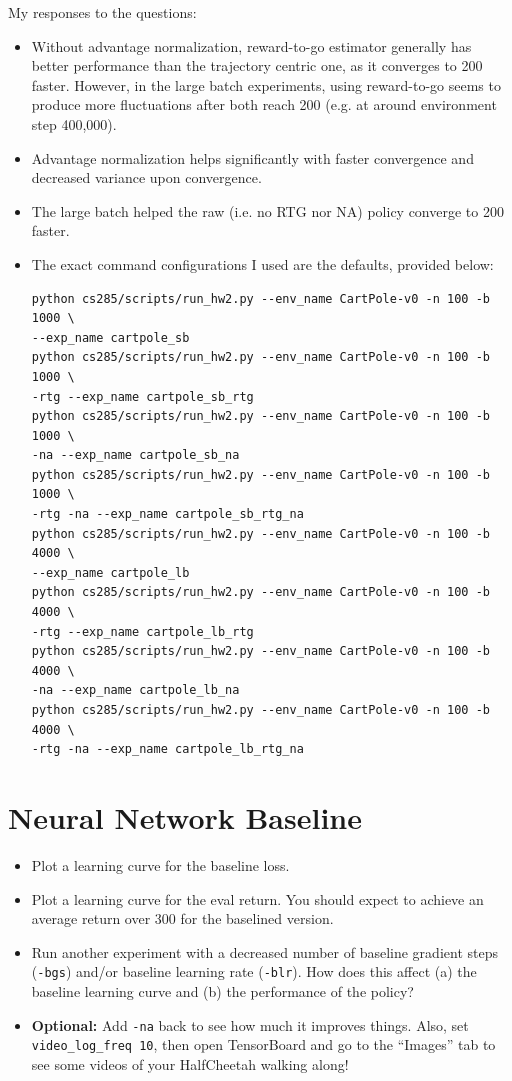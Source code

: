 \documentclass{article}
\begin{document}
\begin{sol}
    My responses to the questions:
    \begin{itemize}
        \item Without advantage normalization, reward-to-go estimator generally has better performance than the trajectory centric one, as it converges to 200 faster. However, in the large batch experiments, using reward-to-go seems to produce more fluctuations after both reach 200 (e.g. at around environment step 400,000).
        \item Advantage normalization helps significantly with faster convergence and decreased variance upon convergence.
        \item The large batch helped the raw (i.e. no RTG nor NA) policy converge to 200 faster.
        \item The exact command configurations I used are the defaults, provided below:
        \begin{lstlisting}
python cs285/scripts/run_hw2.py --env_name CartPole-v0 -n 100 -b 1000 \
--exp_name cartpole_sb
python cs285/scripts/run_hw2.py --env_name CartPole-v0 -n 100 -b 1000 \
-rtg --exp_name cartpole_sb_rtg
python cs285/scripts/run_hw2.py --env_name CartPole-v0 -n 100 -b 1000 \
-na --exp_name cartpole_sb_na
python cs285/scripts/run_hw2.py --env_name CartPole-v0 -n 100 -b 1000 \
-rtg -na --exp_name cartpole_sb_rtg_na
python cs285/scripts/run_hw2.py --env_name CartPole-v0 -n 100 -b 4000 \
--exp_name cartpole_lb
python cs285/scripts/run_hw2.py --env_name CartPole-v0 -n 100 -b 4000 \
-rtg --exp_name cartpole_lb_rtg
python cs285/scripts/run_hw2.py --env_name CartPole-v0 -n 100 -b 4000 \
-na --exp_name cartpole_lb_na
python cs285/scripts/run_hw2.py --env_name CartPole-v0 -n 100 -b 4000 \
-rtg -na --exp_name cartpole_lb_rtg_na
        \end{lstlisting}
    \end{itemize}
\end{sol}

\newpage\section{Neural Network Baseline}
\begin{itemize}
    \item Plot a learning curve for the baseline loss.
    \item Plot a learning curve for the eval return. You should expect to achieve an average return over 300 for the baselined version.
    \item Run another experiment with a decreased number of baseline gradient steps (\verb|-bgs|) and/or baseline learning rate (\verb|-blr|). How does this affect (a) the baseline learning curve and (b) the performance of the policy?
    \item \textbf{Optional:} Add \verb|-na| back to see how much it improves things. Also, set \verb|video_log_freq 10|, then open TensorBoard and go to the ``Images'' tab to see some videos of your HalfCheetah walking along!
\end{itemize}
\end{document}
